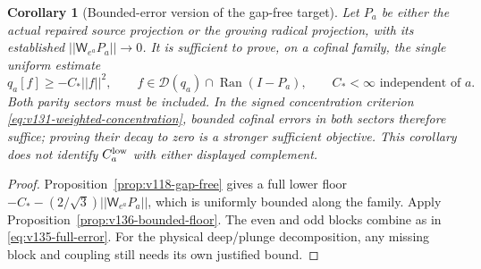 \documentclass[11pt]{article}
\def\norm#1{||#1||}%
\newtheorem{corollary}[theorem]{Corollary}
\theoremstyle{remark}
\newcommand{\norm}[1]{\left\lVert #1\right\rVert}
\begin{document}
\begin{corollary}[Bounded-error version of the gap-free target]
\label{cor:v136-complement-floor}
Let $P_a$ be either the actual repaired source projection or the
growing radical projection, with its established
$\norm{\mathsf W_{e^a}P_a}\to0$. It is sufficient to prove, on a
cofinal family, the single uniform estimate
\begin{equation}\label{eq:v136-complement-target}
 q_a[f]\ge-C_*\norm f^2,
 \qquad f\in\mathcal D(q_a)\cap\operatorname{Ran}(I-P_a),
 \qquad C_*<\infty\text{ independent of }a.
\end{equation}
Both parity sectors must be included. In the signed concentration
criterion \eqref{eq:v131-weighted-concentration}, bounded cofinal
errors in both sectors therefore suffice; proving their decay to zero
is a stronger sufficient objective. This corollary does not identify
$C_a^{\rm low}$ with either displayed complement.
\end{corollary}
\begin{proof}
Proposition~\ref{prop:v118-gap-free} gives a full lower floor
$-C_*-(2/\sqrt3)\norm{\mathsf W_{e^a}P_a}$, which is uniformly
bounded along the family. Apply Proposition~\ref{prop:v136-bounded-floor}.
The even and odd blocks combine as in \eqref{eq:v135-full-error}.
For the physical deep/plunge decomposition, any missing block and
coupling still needs its own justified bound.
\end{proof}
\end{document}
